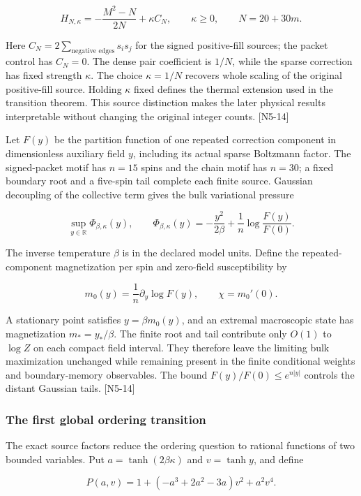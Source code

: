\[H_{N,\kappa}=-\frac{M^2-N}{2N}+\kappa C_N,\qquad \kappa\ge0,\qquad N=20+30m.\]

Here \(C_N=2\sum_{\text{negative edges}}s_i s_j\) for the signed positive-fill sources; the packet control has \(C_N=0\). The dense pair coefficient is \(1/N\), while the sparse correction has fixed strength \(\kappa\). The choice \(\kappa=1/N\) recovers whole scaling of the original positive-fill source. Holding \(\kappa\) fixed defines the thermal extension used in the transition theorem. This source distinction makes the later physical results interpretable without changing the original integer counts. {[}N5-14{]}

Let \(F(y)\) be the partition function of one repeated correction component in dimensionless auxiliary field \(y\), including its actual sparse Boltzmann factor. The signed-packet motif has \(n=15\) spins and the chain motif has \(n=30\); a fixed boundary root and a five-spin tail complete each finite source. Gaussian decoupling of the collective term gives the bulk variational pressure

\[\sup_{y\in\mathbb R}\Phi_{\beta,\kappa}(y),\qquad
\Phi_{\beta,\kappa}(y)=-\frac{y^2}{2\beta}+\frac1n\log\frac{F(y)}{F(0)}.\]

The inverse temperature \(\beta\) is in the declared model units. Define the repeated-component magnetization per spin and zero-field susceptibility by

\[m_0(y)=\frac1n\partial_y\log F(y),\qquad \chi=m_0'(0).\]

A stationary point satisfies \(y=\beta m_0(y)\), and an extremal macroscopic state has magnetization \(m_*=y_*/\beta\). The finite root and tail contribute only \(O(1)\) to \(\log Z\) on each compact field interval. They therefore leave the limiting bulk maximization unchanged while remaining present in the finite conditional weights and boundary-memory observables. The bound \(F(y)/F(0)\le e^{n|y|}\) controls the distant Gaussian tails. {[}N5-14{]}

\subsubsection{The first global ordering transition}\label{the-first-global-ordering-transition}

The exact source factors reduce the ordering question to rational functions of two bounded variables. Put \(a=\tanh(2\beta\kappa)\) and \(v=\tanh y\), and define

\[P(a,v)=1+(-a^3+2a^2-3a)v^2+a^2v^4.\]

